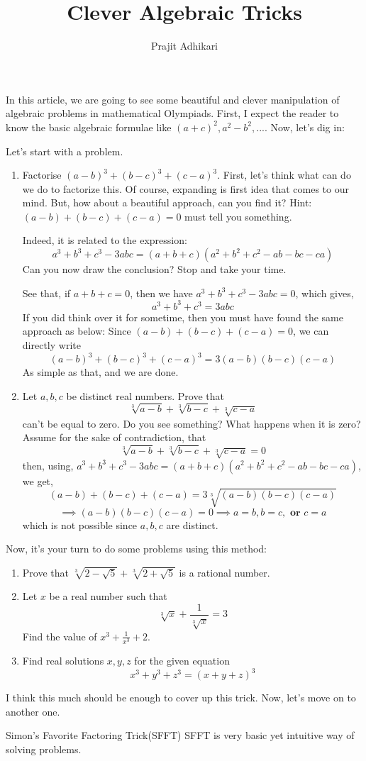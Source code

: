 \documentclass{article}
\begin{document}
\title{Clever Algebraic Tricks}
\author{Prajit Adhikari}
\date{}
\maketitle


In this article, we are going to see some beautiful and clever manipulation of algebraic problems in mathematical Olympiads. First, I expect the reader to know the basic algebraic formulae like $(a+c)^2, a^2-b^2,...$. Now, let's dig in:

Let's start with a problem.
\begin{enumerate}
    \item Factorise $(a-b)^3+(b-c)^3+(c-a)^3$.
\newline
First, let's think what can do we do to factorize this. Of course, expanding is first idea that comes to our mind. But, how about a beautiful approach, can you find it?
Hint: $(a-b)+(b-c)+(c-a)=0$ must tell you something.

Indeed, it is related to the expression:
$$a^3+b^3+c^3-3abc = (a+b+c)(a^2+b^2+c^2-ab-bc-ca)$$
Can you now draw the conclusion? Stop and take your time.

See that, if $a+b+c =0$, then we have $a^3+b^3+c^3-3abc=0$, which gives,
$$a^3+b^3+c^3=3abc$$
If you did think over it for sometime, then you must have found the same approach as below:
Since $(a-b)+(b-c)+(c-a)=0$, we can directly write 
$$(a-b)^3+(b-c)^3+(c-a)^3= 3(a-b)(b-c)(c-a)$$
As simple as that, and we are done. 


\item Let $a,b,c$ be distinct real numbers. Prove that 
$$\sqrt[3]{a-b} + \sqrt[3]{b-c} +\sqrt[3]{c-a}$$
can't be equal to zero.
\newline
Do you see something? What happens when it is zero? 
Assume for the sake of contradiction, that
$$\sqrt[3]{a-b} + \sqrt[3]{b-c} +\sqrt[3]{c-a} = 0$$
then, using, $a^3+b^3+c^3-3abc = (a+b+c)(a^2+b^2+c^2-ab-bc-ca)$, we get,
$$(a-b)+(b-c)+(c-a) = 3\sqrt[3]{(a-b)(b-c)(c-a)}$$
$$\implies (a-b)(b-c)(c-a)=0  \implies a=b, b=c, \textbf{ or } c=a$$
which is not possible since $a,b,c$ are distinct.
\end{enumerate}

Now, it's your turn to do some problems using this method:
\begin{enumerate}
    \item Prove that $\sqrt[3]{2- \sqrt{5}}+ \sqrt[3]{2+ \sqrt{5}}$ is a rational number.
    
    \item Let $x$ be a real number such that 
    $$ \sqrt[3]{x} +\frac{1}{\sqrt[3]{x}} =3$$
    Find the value of $x^3+\frac{1}{x^3}+2$.
    
    \item Find real solutions $x,y,z$ for the given equation
    $$x^3+y^3+z^3 = (x+y+z)^3$$
\end{enumerate}
I think this much should be enough to cover up this trick. Now, let's move on to another one.


Simon's Favorite Factoring Trick(SFFT)
SFFT is very basic yet intuitive way of solving problems. 
\end{document}
